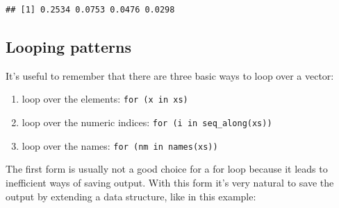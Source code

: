 \begin{Shaded}
\begin{Highlighting}[]
\StringTok{ }\NormalTok{(}\NormalTok{, }\NormalTok{, }\NormalTok{, }\NormalTok{)}
\StringTok{ }\NormalTok{(}\NormalTok{)}
\NormalTok{(}
\end{Highlighting}
\end{Shaded}

\begin{verbatim}
## [1] 0.2534 0.0753 0.0476 0.0298
\end{verbatim}

\hypertarget{looping-patterns}{%
\subsection{Looping patterns}\label{looping-patterns}}

It's useful to remember that there are three basic ways to loop over a
vector: 

\begin{enumerate}
\def\labelenumi{\arabic{enumi}.}
\tightlist
\item
  loop over the elements: \texttt{for\ (x\ in\ xs)}
\item
  loop over the numeric indices: \texttt{for\ (i\ in\ seq\_along(xs))}
\item
  loop over the names: \texttt{for\ (nm\ in\ names(xs))}
\end{enumerate}

The first form is usually not a good choice for a for loop because it
leads to inefficient ways of saving output. With this form it's very
natural to save the output by extending a data structure, like in this
example:

\begin{Shaded}
\begin{Highlighting}[]
\StringTok{ }\NormalTok{(}\NormalTok{)}
\StringTok{ }\NormalTok{()}
\StringTok{ }
\NormalTok{\}}
\end{Highlighting}
\end{Shaded}

